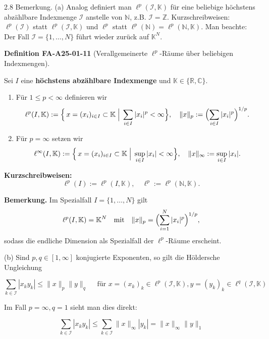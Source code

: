 \documentclass[10pt, letterpaper]{article}
\newcommand{\CustomHeading}[3]{%
  \par\medskip\noindent%
  \textbf{#1 #2} \textnormal{(#3)}.\enskip%
}
\newenvironment{DEF}[2]{\begin{unitbox}\CustomHeading{Definition}{#1}{#2}}{\end{unitbox}}
\begin{document}
2.8 Bemerkung. (a) Analog definiert man $\ell^{p}(\mathcal{I}, \mathbb{K})$ für eine beliebige höchstens abzählbare Indexmenge $\mathcal{I}$ anstelle von $\mathbb{N}$, z.B. $\mathcal{I}=\mathbb{Z}$. Kurzschreibweisen: $\ell^{p}(\mathcal{I})$ statt $\ell^{p}(\mathcal{I}, \mathbb{K})$ und $\ell^{p}$ statt $\ell^{p}(\mathbb{N})=\ell^{p}(\mathbb{N}, \mathbb{K})$. Man beachte: Der Fall $\mathcal{I}=\{1, \ldots, N\}$ führt wieder zurück auf $\mathbb{K}^{N}$.




\begin{DEF}{FA-A25-01-11}{Verallgemeinerte $\ell^{p}$-Räume über beliebigen Indexmengen}
Sei $I$ eine \textbf{höchstens abzählbare Indexmenge} und $\mathbb{K}\in\{\mathbb{R},\mathbb{C}\}$.

\begin{enumerate}
\item Für $1\le p<\infty$ definieren wir
\[
\ell^{p}(I,\mathbb{K})
:=\Bigl\{\,x=(x_{i})_{i\in I}\subset\mathbb{K}
\;\Big|\;
\sum_{i\in I}|x_{i}|^{p}<\infty
\Bigr\},
\quad
\|x\|_{p}:=\Bigl(\sum_{i\in I}|x_{i}|^{p}\Bigr)^{1/p}.
\]

\item Für $p=\infty$ setzen wir
\[
\ell^{\infty}(I,\mathbb{K})
:=\Bigl\{\,x=(x_{i})_{i\in I}\subset\mathbb{K}
\;\Big|\;
\sup_{i\in I}|x_{i}|<\infty
\Bigr\},
\quad
\|x\|_{\infty}:=\sup_{i\in I}|x_{i}|.
\]
\end{enumerate}

\textbf{Kurzschreibweisen:}
\[
\ell^{p}(I):=\ell^{p}(I,\mathbb{K}), 
\quad
\ell^{p}:=\ell^{p}(\mathbb{N},\mathbb{K}).
\]

\textbf{Bemerkung.}
Im Spezialfall $I=\{1,\ldots,N\}$ gilt
\[
\ell^{p}(I,\mathbb{K})=\mathbb{K}^{N}
\quad\text{mit}\quad
\|x\|_{p}=\Bigl(\sum_{i=1}^{N}|x_{i}|^{p}\Bigr)^{1/p},
\]
sodass die endliche Dimension als Spezialfall der $\ell^{p}$-Räume erscheint.
\end{DEF}




(b) Sind $p, q \in[1, \infty]$ konjugierte Exponenten, so gilt die Höldersche Ungleichung

$$
\sum_{k \in \mathcal{I}}\left|x_{k} y_{k}\right| \leq\|x\|_{p}\|y\|_{q} \quad \text { für } x=\left(x_{k}\right)_{k} \in \ell^{p}(\mathcal{I}, \mathbb{K}), y=\left(y_{k}\right)_{k} \in \ell^{q}(\mathcal{I}, \mathbb{K})
$$

Im Fall $p=\infty, q=1$ sieht man dies direkt:

$$
\sum_{k \in \mathcal{I}}\left|x_{k} y_{k}\right| \leq \sum_{k \in \mathcal{I}}\|x\|_{\infty}\left|y_{k}\right|=\|x\|_{\infty}\|y\|_{1}
$$
\end{document}
